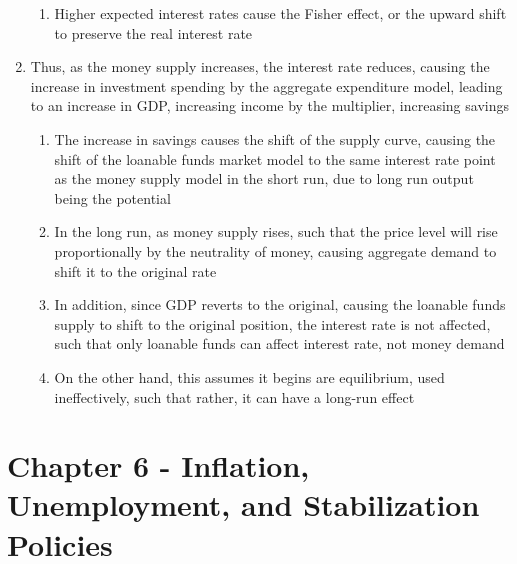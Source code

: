 \begin{enumerate}
\begin{enumerate}
\item Higher expected interest rates cause the Fisher effect, or the upward shift to preserve the real interest rate
\end{enumerate}
\item Thus, as the money supply increases, the interest rate reduces, causing the increase in investment spending by the aggregate expenditure model, leading to an increase in GDP, increasing income by the multiplier, increasing savings
\begin{enumerate}
\item The increase in savings causes the shift of the supply curve, causing the shift of the loanable funds market model to the same interest rate point as the money supply model in the short run, due to long run output being the potential
\item In the long run, as money supply rises, such that the price level will rise proportionally by the neutrality of money, causing aggregate demand to shift it to the original rate
\item In addition, since GDP reverts to the original, causing the loanable funds supply to shift to the original position, the interest rate is not affected, such that only loanable funds can affect interest rate, not money demand
\item On the other hand, this assumes it begins are equilibrium, used ineffectively, such that rather, it can have a long-run effect
\end{enumerate}
\end{enumerate}

\section{Chapter 6 - Inflation, Unemployment, and Stabilization Policies}

